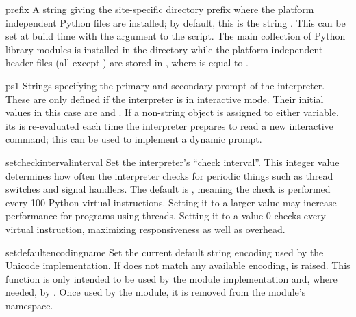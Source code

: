 \begin{datadesc}{prefix}
  A string giving the site-specific directory prefix where the
  platform independent Python files are installed; by default, this is
  the string .  This can be set at build time with
  the  argument to the 
  script.  The main collection of Python library modules is installed
  in the directory  while
  the platform independent header files (all except )
  are stored in , where
   is equal to .
\end{datadesc}

\begin{datadesc}{ps1}
  Strings specifying the primary and secondary prompt of the
  interpreter.  These are only defined if the interpreter is in
  interactive mode.  Their initial values in this case are
   and .  If a non-string object is
  assigned to either variable, its  is re-evaluated
  each time the interpreter prepares to read a new interactive
  command; this can be used to implement a dynamic prompt.
\end{datadesc}

\begin{funcdesc}{setcheckinterval}{interval}
  Set the interpreter's ``check interval''.  This integer value
  determines how often the interpreter checks for periodic things such
  as thread switches and signal handlers.  The default is ,
  meaning the check is performed every 100 Python virtual instructions.
  Setting it to a larger value may increase performance for programs
  using threads.  Setting it to a value \code{<=} 0 checks every
  virtual instruction, maximizing responsiveness as well as overhead.
\end{funcdesc}

\begin{funcdesc}{setdefaultencoding}{name}
  Set the current default string encoding used by the Unicode
  implementation.  If  does not match any available
  encoding,  is raised.  This function is only
  intended to be used by the  module implementation
  and, where needed, by .  Once used by the
   module, it is removed from the 
  module's namespace.
\end{funcdesc}

